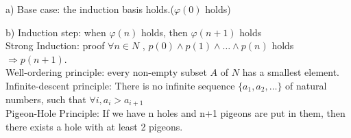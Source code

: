 \documentclass[12pt,a4paper]{ctexrep}
\begin{document}
a) Base case: the induction basis holds.($\varphi(0)$ holds)

b) Induction step: when $\varphi(n)$ holds, then $\varphi(n+1)$ holds\\
Strong Induction: proof $\forall n \in N$ , $p(0) \wedge p(1) \wedge \dots \wedge p(n)$ holds $\Rightarrow p(n+1)$.\\
Well-ordering principle: every non-empty subset $A$ of $N$ has a smallest element.\\
Infinite-descent principle: There is no infinite sequence $\{a_{1}, a_{2}, \dots \}$ of natural numbers, such that $\forall i, a_{i} > a_{i+1}$\\
Pigeon-Hole Principle: If we have n holes and n+1 pigeons are put in them, then there exists a hole with at least 2 pigeons.
\ifdebug
\end{document}
